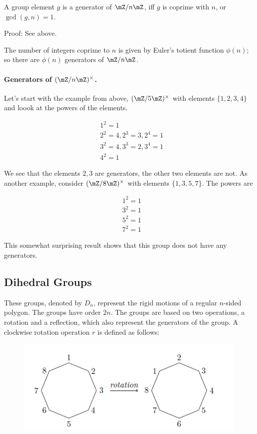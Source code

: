 \begin{theorem}
    A group element $g$ is a generator of $\mZ / n \mZ$, iff $g$ is coprime with $n$, or $\gcd(g, n) = 1$.
\end{theorem}

Proof: See above.

The number of integers coprime to $n$ is given by Euler's totient function $\phi(n)$; so there are $\phi(n)$ generators of $\mZ / n \mZ$.

\paragraph{Generators of $(\mZ / n \mZ)^\times$.} Let's start with the example from above, $(\mZ / 5 \mZ)^\times$ with elements $\{1, 2, 3, 4\}$ and loook at the powers of the elements.

\begin{align*}
    &1^2 = 1\\
    &2^2 = 4, 2^3 = 3, 2^4 = 1 \\
    &3^2 = 4, 3^3 = 2, 3^4 = 1 \\
    &4^2 = 1
\end{align*}

We see that the elements $2, 3$ are generators, the other two elements are not. As another example, consider $(\mZ / 8 \mZ)^\times$ with elements $\{1, 3, 5, 7\}$. The powers are

\begin{align*}
    &1^2 = 1 \\
    &3^2 = 1 \\
    &5^2 = 1 \\
    &7^2 = 1    
\end{align*}

This somewhat surprising result shows that this group does not have any generators.

\subsection{Dihedral Groups}

These groups, denoted by $D_n$, represent the rigid motions of a regular $n$-sided polygon. The groups have order $2n$. The groups are based on two operations, a rotation and a reflection, which also represent the generators of the group. A clockwise rotation operation $r$ is defined as follows:

\begin{figure}[H]
\centering
\includegraphics[scale=0.7]{images/groups_04_1.png}
\end{figure}


